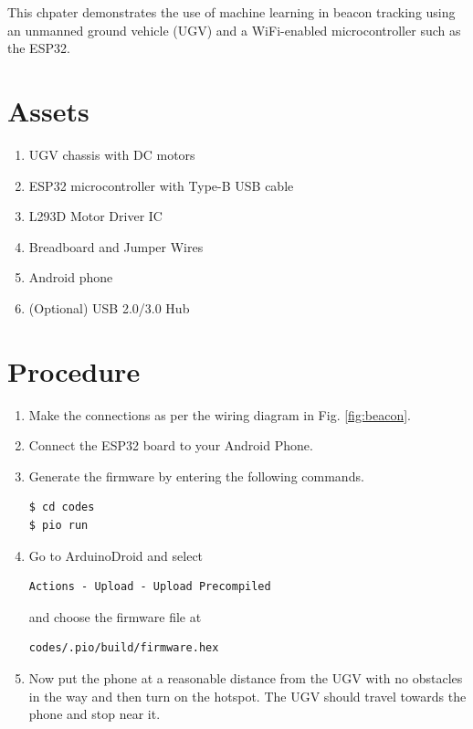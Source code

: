 This chpater demonstrates the use of machine learning in beacon tracking using 
an unmanned ground vehicle (UGV) and a WiFi-enabled microcontroller such as the 
ESP32.

\section{Assets}
\begin{enumerate}
    \item UGV chassis with DC motors
    \item ESP32 microcontroller with Type-B USB cable
    \item L293D Motor Driver IC
    \item Breadboard and Jumper Wires
    \item Android phone
    \item (Optional) USB 2.0/3.0 Hub
\end{enumerate}

\section{Procedure}
\begin{enumerate}
    \item Make the connections as per the wiring diagram in Fig. \ref{fig:beacon}.
    \item Connect the ESP32 board to your Android Phone.
    \item Generate the firmware by entering the following commands.
        \begin{lstlisting}
$ cd codes
$ pio run
        \end{lstlisting}
    \item Go to ArduinoDroid and select
        \begin{lstlisting}
Actions - Upload - Upload Precompiled
        \end{lstlisting}
    and choose the firmware file at
        \begin{lstlisting}
codes/.pio/build/firmware.hex
        \end{lstlisting}
    \item Now put the phone at a reasonable distance from the UGV with no 
    obstacles in the way and then turn on the hotspot. The UGV should travel
    towards the phone and stop near it.
\end{enumerate}

